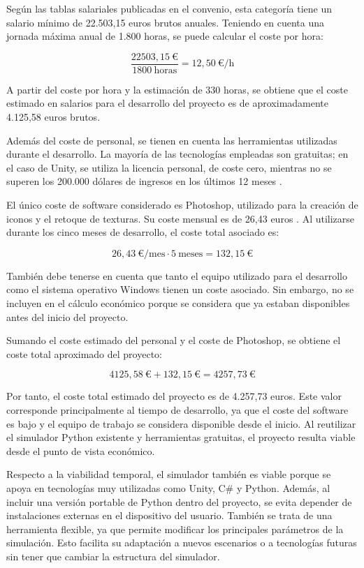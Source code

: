 Según las tablas salariales publicadas en el convenio, esta categoría tiene un salario mínimo de 22.503,15 euros brutos anuales. Teniendo en cuenta una jornada máxima anual de 1.800 horas, se puede calcular el coste por hora:

\[
\frac{22503,15\ \text{€}}{1800\ \text{horas}} = 12,50\ \text{€/h}
\]

A partir del coste por hora y la estimación de 330 horas, se obtiene que el coste estimado en salarios para el desarrollo del proyecto es de aproximadamente 4.125,58 euros brutos.

Además del coste de personal, se tienen en cuenta las herramientas utilizadas durante el desarrollo. La mayoría de las tecnologías empleadas son gratuitas; en el caso de Unity, se utiliza la licencia personal, de coste cero, mientras no se superen los 200.000 dólares de ingresos en los últimos 12 meses \cite{unity_pricing_updates}. 

El único coste de software considerado es Photoshop, utilizado para la creación de iconos y el retoque de texturas. Su coste mensual es de 26,43 euros \cite{photoshop}. Al utilizarse durante los cinco meses de desarrollo, el coste total asociado es:

\[
26,43\ \text{€}/\text{mes} \cdot 5\ \text{meses} = 132,15\ \text{€}
\]

También debe tenerse en cuenta que tanto el equipo utilizado para el desarrollo como el sistema operativo Windows tienen un coste asociado. Sin embargo, no se incluyen en el cálculo económico porque se considera que ya estaban disponibles antes del inicio del proyecto.

Sumando el coste estimado del  personal y el coste de Photoshop, se obtiene el coste total aproximado del proyecto:

\[
4125,58\ \text{€} + 132,15\ \text{€} = 4257,73\ \text{€}
\]

Por tanto, el coste total estimado del proyecto es de 4.257,73 euros. Este valor corresponde principalmente al tiempo de desarrollo, ya que el coste del software es bajo y el equipo de trabajo se considera disponible desde el inicio. Al reutilizar el simulador Python existente y herramientas gratuitas, el proyecto resulta viable desde el punto de vista económico.

Respecto a la viabilidad temporal, el simulador también es viable porque se apoya en tecnologías muy utilizadas como Unity, C\# y Python. Además, al incluir una versión portable de Python dentro del proyecto, se evita depender de instalaciones externas en el dispositivo del usuario. También se trata de una herramienta flexible, ya que permite modificar los principales parámetros de la simulación. Esto facilita su adaptación a nuevos escenarios o a tecnologías futuras sin tener que cambiar la estructura del simulador.

